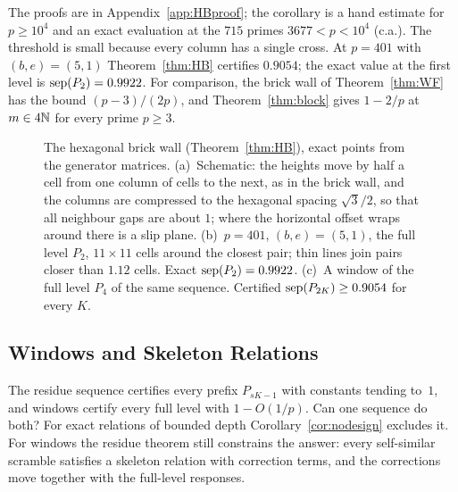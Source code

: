The proofs are in Appendix~\ref{app:HBproof}; the corollary is a hand estimate for $p\ge10^4$ and an exact evaluation at the $715$ primes $3677<p<10^4$ (c.a.). The threshold is small because every column has a single cross. At $p=401$ with $(b,e)=(5,1)$ Theorem~\ref{thm:HB} certifies $0.9054$; the exact value at the first level is $\operatorname{sep}(P_2)=0.9922$. For comparison, the brick wall of Theorem~\ref{thm:WF} has the bound $(p-3)/(2p)$, and Theorem~\ref{thm:block} gives $1-2/p$ at $m\in4\mathbb{N}$ for every prime $p\ge3$.

\begin{figure}[t]
\centering
{}
\caption{The hexagonal brick wall (Theorem~\ref{thm:HB}), exact points from the generator matrices. (a)~Schematic: the heights move by half a cell from one column of cells to the next, as in the brick wall, and the columns are compressed to the hexagonal spacing $\sqrt3/2$, so that all neighbour gaps are about $1$; where the horizontal offset wraps around there is a slip plane. (b)~$p=401$, $(b,e)=(5,1)$, the full level $P_2$, $11\times11$ cells around the closest pair; thin lines join pairs closer than $1.12$ cells. Exact $\operatorname{sep}(P_2)=0.9922$. (c)~A window of the full level $P_4$ of the same sequence. Certified $\operatorname{sep}(P_{2K})\ge0.9054$ for every $K$.}
\label{fig:HB}
\end{figure}

\subsection{Windows and Skeleton Relations}\label{sec:joint}
The residue sequence certifies every prefix $P_{sK-1}$ with constants tending to~$1$, and windows certify every full level with $1-O(1/p)$. Can one sequence do both? For exact relations of bounded depth Corollary~\ref{cor:nodesign} excludes it. For windows the residue theorem still constrains the answer: every self-similar scramble satisfies a skeleton relation with correction terms, and the corrections move together with the full-level responses.

